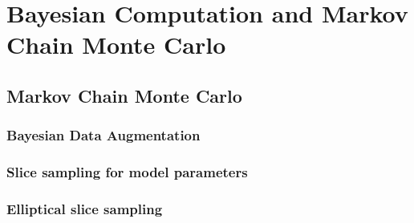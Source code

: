 \section{Bayesian Computation and Markov Chain Monte Carlo}
\label{sec:bayesian_computation}

\subsection{Markov Chain Monte Carlo}
\label{subsec:mcmc}

\subsubsection{Bayesian Data Augmentation}
\label{subsec:data_augmentation}

\subsubsection{Slice sampling for model parameters}
\label{subsubsec:slice_sampling}

\subsubsection{Elliptical slice sampling}
\label{subsubsec:elliptical_slice_sampling}
